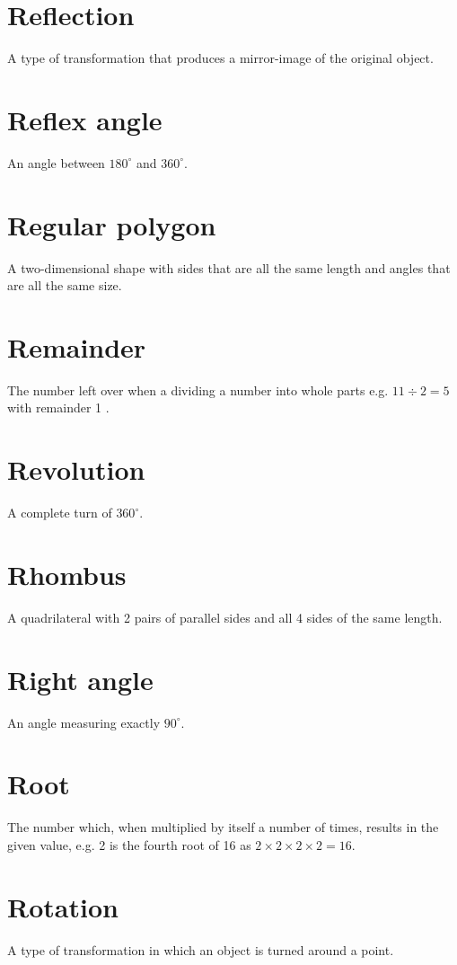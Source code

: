 \documentclass[10pt]{article}
\begin{document}
\section*{Reflection}
A type of transformation that produces a mirror-image of the original object.

\section*{Reflex angle}
An angle between $180^{\circ}$ and $360^{\circ}$.

\section*{Regular polygon}
A two-dimensional shape with sides that are all the same length and angles that are all the same size.

\section*{Remainder}
The number left over when a dividing a number into whole parts e.g. $11 \div 2=5$ with remainder 1 .

\section*{Revolution}
A complete turn of $360^{\circ}$.

\section*{Rhombus}
A quadrilateral with 2 pairs of parallel sides and all 4 sides of the same length.

\section*{Right angle}
An angle measuring exactly $90^{\circ}$.

\section*{Root}
The number which, when multiplied by itself a number of times, results in the given value, e.g. 2 is the fourth root of 16 as $2 \times 2 \times 2 \times 2=16$.

\section*{Rotation}
A type of transformation in which an object is turned around a point.
\end{document}
